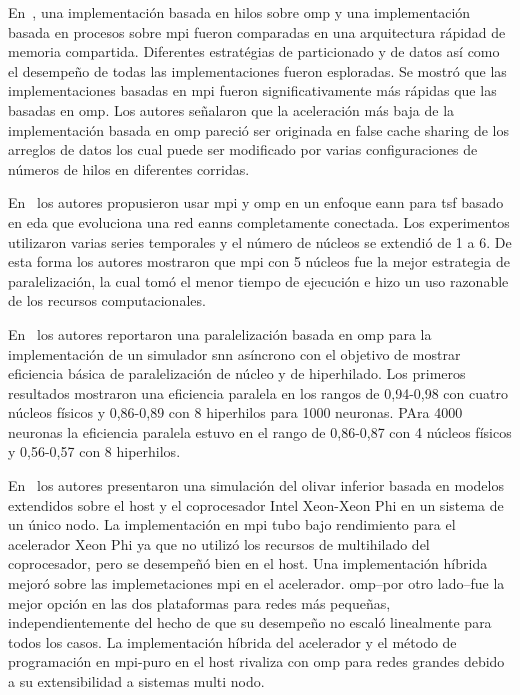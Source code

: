 {En~\cite{Strey2003ACO}, una implementación basada en hilos sobre \gls{omp} y una implementación basada en procesos sobre \gls{mpi} fueron comparadas en una arquitectura rápidad de memoria compartida.
Diferentes estratégias de particionado y de datos así como el desempeño de todas las implementaciones fueron esploradas.
Se mostró que las implementaciones basadas en \gls{mpi} fueron significativamente más rápidas que las basadas en \gls{omp}.
Los autores señalaron que la aceleración más baja de la implementación basada en \gls{omp} pareció ser originada en false cache sharing de los arreglos de datos los cual puede ser modificado por varias configuraciones de números de hilos en diferentes corridas.

En~\cite{6232827} los autores propusieron usar \gls{mpi} y \gls{omp} en un enfoque \gls{eann} para \gls{tsf} basado en \gls{eda} que evoluciona una red \glspl{eann} completamente conectada.  
Los experimentos utilizaron varias series temporales y el número de núcleos se extendió de 1 a 6.
De esta forma los autores mostraron que \gls{mpi} con 5 núcleos fue la mejor estrategia de paralelización, la cual tomó el menor tiempo de ejecución e hizo un uso razonable de los recursos computacionales.

En~\cite{6511739} los autores reportaron una paralelización basada en \gls{omp} para la implementación de un simulador \gls{snn} asíncrono con el objetivo de mostrar eficiencia básica de paralelización de núcleo y de hiperhilado.
Los primeros resultados mostraron una eficiencia paralela en los rangos de 0,94-0,98 con cuatro núcleos físicos y 0,86-0,89 con 8 hiperhilos para 1000 neuronas.
PAra 4000 neuronas la eficiencia paralela estuvo en el rango de 0,86-0,87 con 4 núcleos físicos y 0,56-0,57 con 8 hiperhilos.

En~\cite{Chatzikonstantis:2016:FID:2903150.2903477} los autores presentaron una simulación del olivar inferior basada en modelos  extendidos sobre el host y el coprocesador Intel Xeon-Xeon Phi en un sistema de un único nodo.
La implementación en \gls{mpi} tubo bajo rendimiento para el acelerador Xeon Phi ya que no utilizó los recursos de multihilado del coprocesador, pero se desempeñó bien en el host. 
Una implementación híbrida mejoró sobre las implemetaciones \gls{mpi} en el acelerador.
\gls{omp}--por otro lado--fue la mejor opción en las dos plataformas para redes más pequeñas, independientemente del hecho de que su desempeño no escaló linealmente para todos los casos.
La implementación híbrida del acelerador y el método de programación en \gls{mpi}-puro en el host rivaliza con \gls{omp} para redes grandes debido a su extensibilidad a sistemas multi nodo.
}{
}
